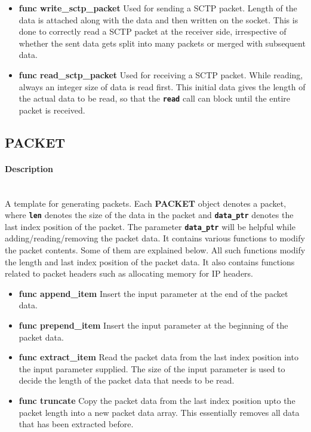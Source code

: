 \documentclass[hidelinks]{report}
\newcommand{\cf}[1] {
	\textbf{\texttt{#1}}
}
\begin{document}
\begin{itemize}

\item \textbf{func write\_sctp\_packet} Used for sending a SCTP packet. Length of the data is attached along with the data and then written on the socket. This is done to correctly read a SCTP packet at the receiver side, irrespective of whether the sent data gets split into many packets or merged with subsequent data.

\item \textbf{func read\_sctp\_packet} Used for receiving a SCTP packet. While reading, always an integer size of data is read first. This initial data gives the length of the actual data to be read, so that the \cf{read} call can block until the entire packet is received.

\end{itemize}

\subsection*{PACKET}

\paragraph*{Description}

~\\ A template for generating packets. Each \textbf{PACKET} object denotes a packet, where \cf{len} denotes the size of the data in the packet and \cf{data\_ptr} denotes the last index position of the packet. The parameter \cf{data\_ptr} will be helpful while adding/reading/removing the packet data. It contains various functions to modify the packet contents. Some of them are explained below. All such functions modify the length and last index position of the packet data. It also contains functions related to packet headers such as allocating memory for IP headers.

\begin{itemize}

\item \textbf{func append\_item} Insert the input parameter at the end of the packet data. 

\item \textbf{func prepend\_item} Insert the input parameter at the beginning of the packet data.

\item \textbf{func extract\_item} Read the packet data from the last index position into the input parameter supplied. The size of the input parameter is used to decide the length of the packet data that needs to be read.

\item \textbf{func truncate} Copy the packet data from the last index position upto the packet length into a new packet data array. This essentially removes all data that has been extracted before.

\end{itemize}
\end{document}
